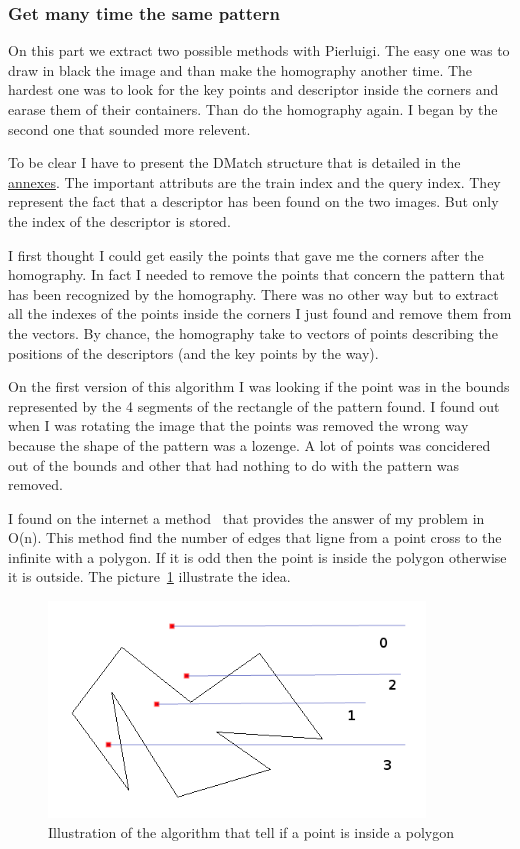 \documentclass[english,a4paper,11pt]{report}
\begin{document}
	\subsubsection[Multiple pattern]{Get many time the same pattern}

	\par On this part we extract two possible methods with Pierluigi. The easy one was to draw in black the image and than make the homography another time. The hardest one was to look for the key points and descriptor inside the corners and earase them of their containers. Than do the homography again. I began by the second one that sounded more relevent. 
	
	\par To be clear I have to present the DMatch structure that is detailed in the \hyperlink{structDMatch}{annexes}. The important attributs are the train index and the query index. They represent the fact that a descriptor has been found on the two images. But only the index of the descriptor is stored.
	
	\par I first thought I could get easily the points that gave me the corners after the homography. In fact I needed to remove the points that concern the pattern that has been recognized by the homography. There was no other way but to extract all the indexes of the points inside the corners I just found and remove them from the vectors. By chance, the homography take to vectors of points describing the positions of the descriptors (and the key points by the way). 
	\par On the first version of this algorithm I was looking if the point was in the bounds represented by the 4 segments of the rectangle of the pattern found. I found out when I was rotating the image that the points was removed the wrong way because the shape of the pattern was a lozenge. A lot of points was concidered out of the bounds and other that had nothing to do with the pattern was removed.
	\par I found on the internet a method~\cite{InOut} that provides the answer of my problem in O(n). This method find the number of edges that ligne from a point cross to the infinite with a polygon. If it is odd then the point is inside the polygon otherwise it is outside. The picture~\ref{OutIn} illustrate the idea.
	\begin{figure}[h]
		\begin{center}
			\includegraphics[width=10cm]{images_not_compressed/isIn.png}
			\caption{Illustration of the algorithm that tell if a point is inside a polygon}
			\label{OutIn}	
		\end{center}
	\end{figure}
\end{document}
